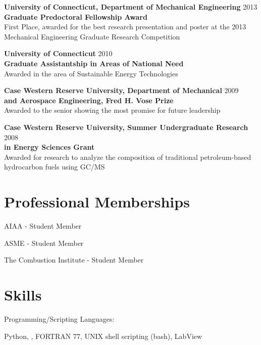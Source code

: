\begin{lonelist}
   \item[] \textbf{University of Connecticut, Department of Mechanical
                   Engineering} \hfill 2013\\
           \textbf{Graduate Predoctoral Fellowship Award}\\
            First Place, awarded for the best research presentation and
            poster at the 2013 Mechanical Engineering Graduate Research 
            Competition
   \item[] \textbf{University of Connecticut} \hfill 2010\\
           \textbf{Graduate Assistantship in Areas of National Need}\\
            Awarded in the area of Sustainable Energy Technologies

   \item[] \textbf{Case Western Reserve University, Department of
                   Mechanical} \hfill 2009\\
           \textbf{and Aerospace Engineering, Fred H. Vose Prize}\\
           Awarded to the senior showing the most promise for future 
           leadership

   \item[] \textbf{Case Western Reserve University, Summer
                   Undergraduate Research} \hfill 2008\\
           \textbf{in Energy Sciences Grant}\\
           Awarded for research to analyze the composition of 
           traditional petroleum-based hydrocarbon fuels using GC/MS
\end{lonelist}

\section{Professional Memberships}
AIAA - Student Member

ASME - Student Member

The Combustion Institute - Student Member


\section{Skills}
Programming/Scripting Languages:
%
\begin{innerlist}
    \item Python, \Matlab, FORTRAN 77, UNIX shell scripting (bash), LabView
\end{innerlist}

